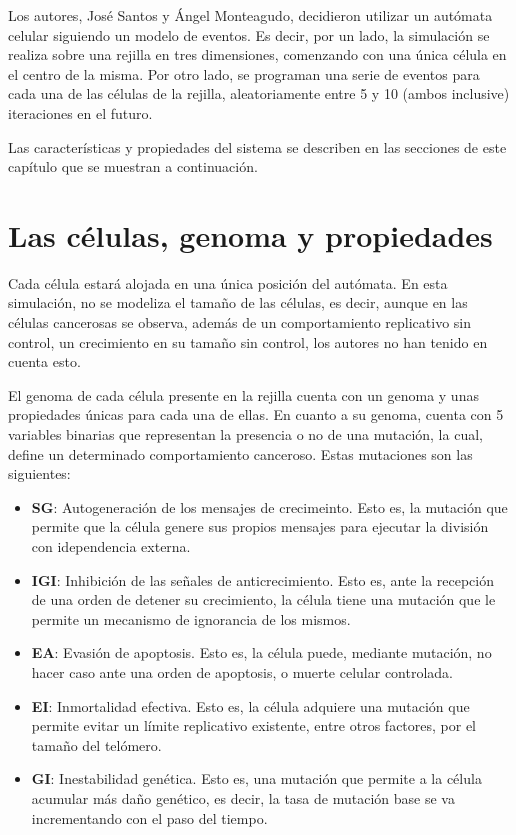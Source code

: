 Los autores, José Santos y Ángel Monteagudo, decidieron utilizar un autómata celular
siguiendo un modelo de eventos. Es decir, por un lado, la simulación se realiza
sobre una rejilla en tres dimensiones, comenzando con una única célula en el centro de la misma.
Por otro lado, se programan una serie de eventos para cada una de las células de la rejilla, aleatoriamente
entre 5 y 10 (ambos inclusive) iteraciones en el futuro.

Las características y propiedades del sistema se describen en las secciones de este capítulo que
se muestran a continuación.

\section{Las células, genoma y propiedades}

Cada célula estará alojada en una única posición del autómata. En esta simulación, no se modeliza
el tamaño de las células, es decir, aunque en las células cancerosas se observa, además de un comportamiento
replicativo sin control, un crecimiento en su tamaño sin control, los autores no han tenido en cuenta esto.

El genoma de cada célula presente en la rejilla cuenta con un genoma y unas propiedades únicas para cada una de ellas.
En cuanto a su genoma, cuenta con 5 variables binarias que representan la presencia o no de una mutación, la cual, define
un determinado comportamiento canceroso. Estas mutaciones son las siguientes:

\begin{itemize}
    \item \textbf{SG}: Autogeneración de los mensajes de crecimeinto. Esto es, la mutación que permite que la
    célula genere sus propios mensajes para ejecutar la división con idependencia externa.
    \item \textbf{IGI}: Inhibición de las señales de anticrecimiento. Esto es, ante la recepción de una orden
    de detener su crecimiento, la célula tiene una mutación que le permite un mecanismo de ignorancia de los mismos.
    \item \textbf{EA}: Evasión de apoptosis. Esto es, la célula puede, mediante mutación, no hacer caso ante
    una orden de apoptosis, o muerte celular controlada.
    \item \textbf{EI}: Inmortalidad efectiva. Esto es, la célula adquiere una mutación que permite evitar un límite
    replicativo existente, entre otros factores, por el tamaño del telómero.
    \item \textbf{GI}: Inestabilidad genética. Esto es, una mutación que permite a la célula acumular más daño genético, es decir,
    la tasa de mutación base se va incrementando con el paso del tiempo.
\end{itemize}

